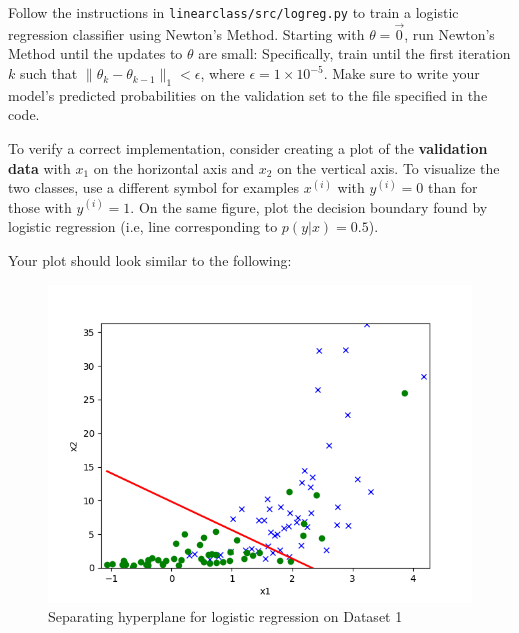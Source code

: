 \item {}
Follow the instructions in \texttt{linearclass/src/logreg.py} to train a logistic regression classifier using Newton's Method. Starting with $\theta = \vec{0}$, run Newton's Method until the updates to $\theta$ are small: Specifically,  train until the first iteration $k$ such that $\|\theta_{k} - \theta_{k-1}\|_1 < \epsilon$, where $\epsilon = 1\times 10^{-5}$. Make sure to write your model's predicted probabilities on the validation set to the file specified in the code.

To verify a correct implementation, consider creating a plot of the \textbf{validation data} with $x_1$ on the horizontal axis and $x_2$ on the vertical axis. To visualize the two classes, use a different symbol for examples $x^{(i)}$ with $y^{(i)} = 0$ than for those with $y^{(i)} = 1$. On the same figure, plot the decision boundary found by logistic regression (i.e, line corresponding to $p(y|x) = 0.5$).

Your plot should look similar to the following:

\begin{figure}[H]
	\centering
	\vspace{2mm}
	\includegraphics[width=0.65\linewidth]{linearclass/src/p01b_pred_1.png}
    \caption{Separating hyperplane for logistic regression on Dataset 1}
\end{figure}
